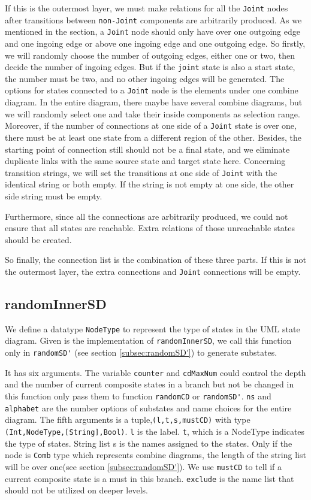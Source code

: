 If this is the outermost layer, we must make relations for all the \verb|Joint| nodes after transitions between \verb|non-Joint| components are arbitrarily produced.
As we mentioned in the section, a \verb|Joint| node should only have over one outgoing edge and one ingoing edge or above one ingoing edge and one outgoing edge. So firstly, we will randomly choose the number of outgoing edges, either one or two, then decide the number of ingoing edges. But if the \verb|joint| state is also a start state, the number must be two, and no other ingoing edges will be generated.
The options for states connected to a \verb|Joint| node is the elements under one combine diagram. In the entire diagram, there maybe have several combine diagrams, but we will randomly select one and take their inside components as selection range.
Moreover, if the number of connections at one side of a \verb|Joint| state is over one, there must be at least one state from a different region of the other.
Besides, the starting point of connection still should not be a final state, and we eliminate duplicate links with the same source state and target state here.
Concerning transition strings, we will set the transitions at one side of  \verb|Joint| with the identical string or both empty. If the string is not empty at one side, the other side string must be empty.

Furthermore, since all the connections are arbitrarily produced, we could not ensure that all states are reachable. Extra relations of those unreachable states should be created.

So finally, the connection list is the combination of these three parts. If this is not the outermost layer, the extra connections and \verb|Joint| connections will be empty.

\subsection{randomInnerSD}
\label{subsec:randomInnerSD}
We define a datatype \verb|NodeType| to represent the type of states in the UML state diagram.
Given is the implementation of \verb|randomInnerSD|, we call this function only in \verb|randomSD'| (see section \ref{subsec:randomSD'}) to generate substates.

It has six arguments. 
The variable \verb|counter| and \verb|cdMaxNum| could control the depth and the number of current composite states in a branch but not be changed in this function only pass them to function \verb|randomCD| or \verb|randomSD'|.
\verb|ns| and \verb|alphabet| are the number options of substates and name choices for the entire diagram.
The fifth arguments is a tuple,\verb|(l,t,s,mustCD)| with type\verb| (Int,NodeType,[String],Bool)|. \verb|l| is the label.
\verb|t|, which is a NodeType indicates the type of states.
String list s is the names assigned to the states. 
Only if the node is \verb|Comb| type which represents combine diagrams, the length of the string list will be over one(see section \ref{subsec:randomSD'}).
We use \verb|mustCD| to tell if a current composite state is a must in this branch.
\verb|exclude| is the name list that should not be utilized on deeper levels.

